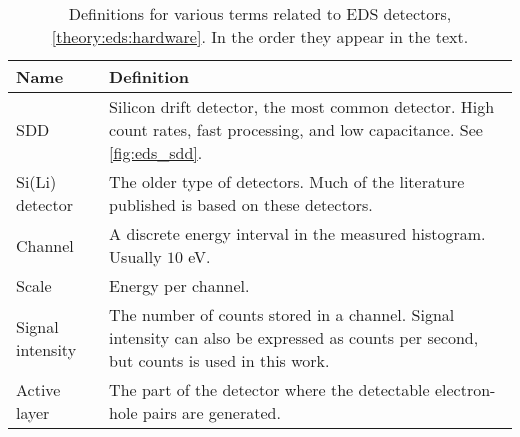 \begin{table}[pht]
    \begin{center}
        \caption{
            Definitions for various terms related to EDS detectors, \cref{theory:eds:hardware}.
            In the order they appear in the text.
        }
        \renewcommand*{\arraystretch}{1.4}
        \label{tab:eds:hardware}
        \begin{tabular}{p{2.9cm}p{12cm}}
            \hline
            \textbf{Name}                      & \textbf{Definition}                                                                                                                                                                                                                                 \\
            \hline
            SDD                                & Silicon drift detector, the most common detector.  High count rates, fast processing, and low capacitance.  See \cref{fig:eds_sdd}.                                                                                                                 \\
            Si(Li) detector                    & The older type of detectors. Much of the literature published is based on these detectors.                                                                                                                                                          \\
            Channel                            & A discrete energy interval in the measured histogram. Usually $10$ eV.                                                                                                                                                                                \\
            Scale                              & Energy per channel.                                                                                                                                                                                                                                 \\
            Signal intensity                   & The number of counts stored in a channel. Signal intensity can also be expressed as counts per second, but counts is used in this work.                                                                                                             \\
            Active layer                       & The part of the detector where the detectable electron-hole pairs are generated.                                                                                                                                                                    \\

\end{tabular}
\end{center}
\end{table}
